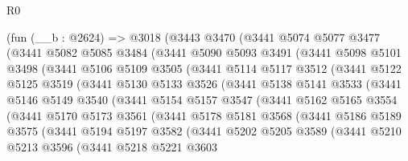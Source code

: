 \begin{lexlean}{R0}
\begin{coremodule}
    (fun (__b : @2624) =>
    @3018
      (@3443
        @3470
        (@3441
          @5074
          @5077
          @3477
          (@3441
            @5082
            @5085
            @3484
            (@3441
              @5090
              @5093
              @3491
              (@3441
                @5098
                @5101
                @3498
                (@3441
                  @5106
                  @5109
                  @3505
                  (@3441
                    @5114
                    @5117
                    @3512
                    (@3441
                      @5122
                      @5125
                      @3519
                      (@3441
                        @5130
                        @5133
                        @3526
                        (@3441
                          @5138
                          @5141
                          @3533
                          (@3441
                            @5146
                            @5149
                            @3540
                            (@3441
                              @5154
                              @5157
                              @3547
                              (@3441
                                @5162
                                @5165
                                @3554
                                (@3441
                                  @5170
                                  @5173
                                  @3561
                                  (@3441
                                    @5178
                                    @5181
                                    @3568
                                    (@3441
                                      @5186
                                      @5189
                                      @3575
                                      (@3441
                                        @5194
                                        @5197
                                        @3582
                                        (@3441
                                          @5202
                                          @5205
                                          @3589
                                          (@3441
                                            @5210
                                            @5213
                                            @3596
                                            (@3441
                                              @5218
                                              @5221
                                              @3603

\end{coremodule}
\end{lexlean}
